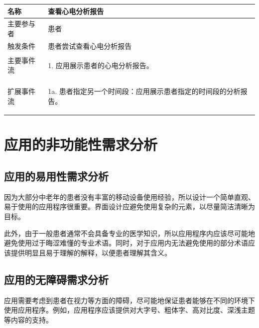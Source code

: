 \begin{table}[!ht]
    \label{tab:uc-report}
    \begin{tabularx}{\textwidth}{|l|X|}
        \hline
        名称    & 查看心电分析报告     \\
        \hline
        主要参与者 & 患者           \\
        \hline
        触发条件  & 患者尝试查看心电分析报告 \\
        \hline
        主要事件流 &
        \begin{itemizec}
            \item[1.] 应用展示患者的心电分析报告。
        \end{itemizec} \\
        \hline
        扩展事件流 &
        \begin{itemizec}
            \item[1a.] 患者指定另一个时间段：应用展示患者指定的时间段的分析报告。
        \end{itemizec} \\
        \hline
    \end{tabularx}
\end{table}


\section{应用的非功能性需求分析}\label{sec:nonfunc-req}

\subsection{应用的易用性需求分析}\label{subsec:usability}

因为大部分中老年的患者没有丰富的移动设备使用经验，所以设计一个简单直观、易于使用的应用程序很重要。界面设计应避免使用复杂的元素，以尽量简洁清晰为目标。

此外，由于一般患者通常不会具备专业的医学知识，所以应用程序内应该尽可能地避免使用过于晦涩难懂的专业术语。同时，对于应用内无法避免使用的部分术语应该提供明显且易于理解的解释，以便患者理解其含义。

\subsection{应用的无障碍需求分析}\label{subsec:accessibility}

应用需要考虑到患者在视力等方面的障碍，尽可能地保证患者能够在不同的环境下使用应用程序。例如，应用程序应该提供对大字号、粗体字、高对比度、深浅主题等内容的支持。

